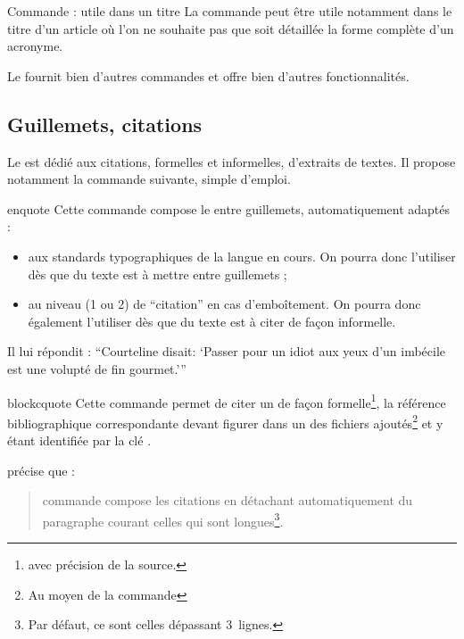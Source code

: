 \begin{dbremark}{Commande  : utile dans un titre}{}
  La commande  peut être utile notamment dans le titre d'un
  article où l'on ne souhaite pas que soit détaillée la forme complète d'un
  acronyme.
\end{dbremark}

Le  fournit bien d'autres commandes et offre bien d'autres
fonctionnalités\autocite[Pour plus de détails, cf. par exemple][]{Bitouze7}.

\subsection{Guillemets, citations}
\label{sec-guillemets-citations}

Le  est dédié aux citations, formelles et informelles,
d'extraits de textes. Il propose notamment la commande 
suivante, simple d'emploi.

\begin{docCommand}{enquote}{}
  Cette commande compose le  entre guillemets, automatiquement
  adaptés :
  \begin{itemize}
  \item aux standards typographiques de la langue en cours. On pourra donc
    l'utiliser dès que du texte est à mettre entre guillemets ;
  \item au niveau (1 ou 2) de \enquote{citation} en cas d'emboîtement. On
    pourra donc également l'utiliser dès que du texte est à citer de façon
    informelle.
  \end{itemize}
\begin{bodycode}
Il lui répondit : \enquote{Courteline disait: \enquote{Passer
    pour un idiot aux yeux d'un imbécile est une volupté de fin
    gourmet.}}
\end{bodycode}
\end{docCommand}

\begin{docCommand}{blockcquote}{}
  Cette commande permet de citer un  de façon
  formelle\footnote{\Ie*{} avec précision de la source.}, la référence
  bibliographique correspondante devant figurer dans un des fichiers 
  ajoutés\footnote{Au moyen de la commande } et
  y étant identifiée par la clé .

\begin{bodycode}
\citeauthor{Bitouze} précise que :
\blockcquote{Bitouze}{%
   commande compose les citations en détachant
  automatiquement du paragraphe courant celles qui sont
  longues\footnote{Par défaut, ce sont celles
    dépassant 3~lignes.}.%
}.
\end{bodycode}
\end{docCommand}

